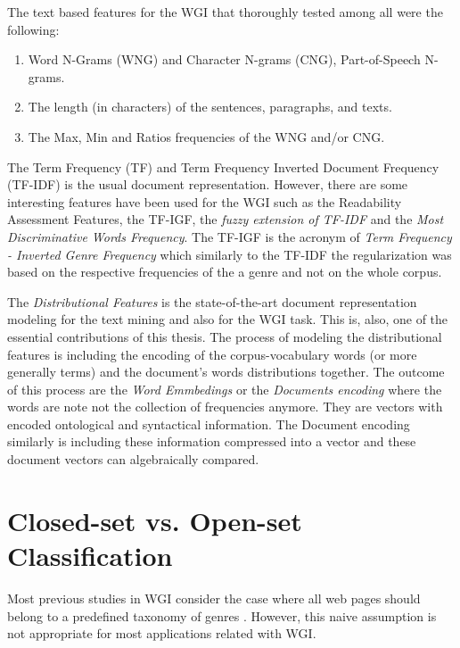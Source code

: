 The text based features for the WGI that thoroughly tested among all were the following:

\begin{enumerate}
\item Word N-Grams (WNG) and Character N-grams (CNG), Part-of-Speech N-grams.
\item The length (in characters) of the sentences, paragraphs, and texts.
\item The Max, Min and Ratios  frequencies of the WNG and/or CNG.
\end{enumerate}

The Term Frequency (TF) and Term Frequency Inverted Document Frequency (TF-IDF) is the usual document representation. However, there are some interesting features have been used for the WGI such as the Readability Assessment Features, the TF-IGF, the \textit{fuzzy extension of TF-IDF} and the \textit{Most Discriminative Words Frequency}. The TF-IGF is the acronym of \textit{Term Frequency - Inverted Genre Frequency} which similarly to the TF-IDF the regularization was based on the respective frequencies of the a genre and not on the whole corpus.

The \textit{Distributional Features} is the state-of-the-art document representation modeling for the text mining and also for the WGI task. This is, also, one of the essential contributions of this thesis. The process of modeling the distributional features is including the encoding of the corpus-vocabulary words (or more generally terms) and the document's words distributions together. The outcome of this process are the \textit{Word Emmbedings} or the\textit{ Documents encoding} where the words are note  not the collection of frequencies anymore. They are vectors with encoded ontological and syntactical information. The Document encoding similarly is including these information compressed into a vector and these document vectors can algebraically compared.

\section{Closed-set vs. Open-set Classification} \label{chap:introduction:sec:openset}

Most previous studies in WGI consider the case where all web pages should belong to a predefined taxonomy of genres \parencite{Lim2005,santini2007automatic,kanaris2009learning,jebari2014pure_URL}. However, this naive assumption is not appropriate for most applications related with WGI. 

